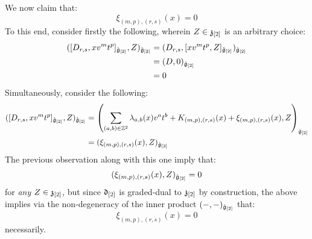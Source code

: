 \begin{remark}
\begin{enumerate}
                    We now claim that:
                        $$\xi_{(m, p), (r, s)}(x) = 0$$
                    To this end, consider firstly the following, wherein $Z \in \mathfrak{z}_{[2]}$ is an arbitrary choice:
                        $$
                            \begin{aligned}
                                ( [D_{r, s}, x v^m t^p]_{\hat{\mathfrak{g}}_{[2]}}, Z )_{\hat{\mathfrak{g}}_{[2]}} & = ( D_{r, s}, [x v^m t^p, Z]_{\tilde{\mathfrak{g}}_{[2]}} )_{\hat{\mathfrak{g}}_{[2]}}
                                \\
                                & = (D, 0)_{\hat{\mathfrak{g}}_{[2]}}
                                \\
                                & = 0
                            \end{aligned}
                        $$
                    Simultaneously, consider the following:
                        $$
                            \begin{aligned}
                                ( [D_{r, s}, x v^m t^p]_{\hat{\mathfrak{g}}_{[2]}}, Z )_{\hat{\mathfrak{g}}_{[2]}} & = \left( \sum_{(a, b) \in \mathbb{Z}^2} \lambda_{a, b}(x) v^a t^b + K_{(m, p), (r, s)}(x) + \xi_{(m, p), (r, s)}(x), Z \right)_{\hat{\mathfrak{g}}_{[2]}}
                                \\
                                & = ( \xi_{(m, p), (r, s)}(x), Z )_{\hat{\mathfrak{g}}_{[2]}}
                            \end{aligned}
                        $$
                    The previous observation along with this one imply that:
                        $$( \xi_{(m, p), (r, s)}(x), Z )_{\hat{\mathfrak{g}}_{[2]}} = 0$$
                    for \textit{any} $Z \in \mathfrak{z}_{[2]}$, but since $\mathfrak{d}_{[2]}$ is graded-dual to $\mathfrak{z}_{[2]}$ by construction, the above implies via the non-degeneracy of the inner product $(-, -)_{\hat{\mathfrak{g}}_{[2]}}$ that:
                        $$\xi_{(m, p), (r, s)}(x) = 0$$
                    necessarily. 


\end{enumerate}
\end{remark}
